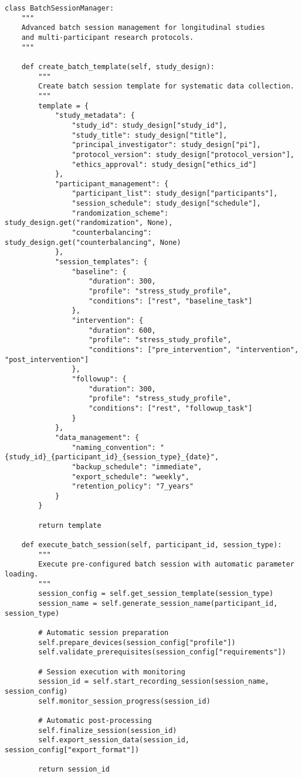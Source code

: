 \documentclass[12pt,a4paper]{article}
\begin{document}
\begin{verbatim}
class BatchSessionManager:
    """
    Advanced batch session management for longitudinal studies
    and multi-participant research protocols.
    """
    
    def create_batch_template(self, study_design):
        """
        Create batch session template for systematic data collection.
        """
        template = {
            "study_metadata": {
                "study_id": study_design["study_id"],
                "study_title": study_design["title"],
                "principal_investigator": study_design["pi"],
                "protocol_version": study_design["protocol_version"],
                "ethics_approval": study_design["ethics_id"]
            },
            "participant_management": {
                "participant_list": study_design["participants"],
                "session_schedule": study_design["schedule"],
                "randomization_scheme": study_design.get("randomization", None),
                "counterbalancing": study_design.get("counterbalancing", None)
            },
            "session_templates": {
                "baseline": {
                    "duration": 300,
                    "profile": "stress_study_profile",
                    "conditions": ["rest", "baseline_task"]
                },
                "intervention": {
                    "duration": 600,
                    "profile": "stress_study_profile", 
                    "conditions": ["pre_intervention", "intervention", "post_intervention"]
                },
                "followup": {
                    "duration": 300,
                    "profile": "stress_study_profile",
                    "conditions": ["rest", "followup_task"]
                }
            },
            "data_management": {
                "naming_convention": "{study_id}_{participant_id}_{session_type}_{date}",
                "backup_schedule": "immediate",
                "export_schedule": "weekly",
                "retention_policy": "7_years"
            }
        }
        
        return template
    
    def execute_batch_session(self, participant_id, session_type):
        """
        Execute pre-configured batch session with automatic parameter loading.
        """
        session_config = self.get_session_template(session_type)
        session_name = self.generate_session_name(participant_id, session_type)
        
        # Automatic session preparation
        self.prepare_devices(session_config["profile"])
        self.validate_prerequisites(session_config["requirements"])
        
        # Session execution with monitoring
        session_id = self.start_recording_session(session_name, session_config)
        self.monitor_session_progress(session_id)
        
        # Automatic post-processing
        self.finalize_session(session_id)
        self.export_session_data(session_id, session_config["export_format"])
        
        return session_id
\end{verbatim}
\end{document}

